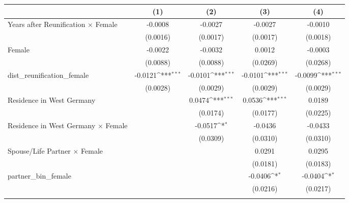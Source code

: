{
\def\sym#1{\ifmmode^{#1}\else\(^{#1}\)\fi}
\begin{tabular}{l*{4}{c}}
\toprule
                    &\multicolumn{1}{c}{(1)}         &\multicolumn{1}{c}{(2)}         &\multicolumn{1}{c}{(3)}         &\multicolumn{1}{c}{(4)}         \\
\midrule
Years after Reunification $\times$ Female&     -0.0008         &     -0.0027         &     -0.0027         &     -0.0010         \\
                    &    (0.0016)         &    (0.0017)         &    (0.0017)         &    (0.0018)         \\
\addlinespace
Female              &     -0.0022         &     -0.0032         &      0.0012         &     -0.0003         \\
                    &    (0.0088)         &    (0.0088)         &    (0.0269)         &    (0.0268)         \\
\addlinespace
dist\_reunification\_female&     -0.0121\sym{***}&     -0.0101\sym{***}&     -0.0101\sym{***}&     -0.0099\sym{***}\\
                    &    (0.0028)         &    (0.0029)         &    (0.0029)         &    (0.0029)         \\
\addlinespace
Residence in West Germany&                     &      0.0474\sym{***}&      0.0536\sym{***}&      0.0189         \\
                    &                     &    (0.0174)         &    (0.0177)         &    (0.0225)         \\
\addlinespace
Residence in West Germany $\times$ Female&                     &     -0.0517\sym{*}  &     -0.0436         &     -0.0433         \\
                    &                     &    (0.0309)         &    (0.0310)         &    (0.0310)         \\
\addlinespace
Spouse/Life Partner $\times$ Female&                     &                     &      0.0291         &      0.0295         \\
                    &                     &                     &    (0.0181)         &    (0.0183)         \\
\addlinespace
partner\_bin\_female  &                     &                     &     -0.0406\sym{*}  &     -0.0404\sym{*}  \\
                    &                     &                     &    (0.0216)         &    (0.0217)         \\
\addlinespace

\end{tabular}}
